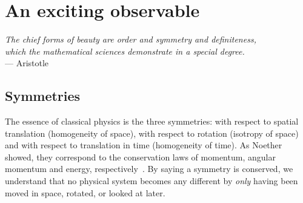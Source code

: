 \chapter{An exciting observable}
\label{ch:nedm-at-psi}




\begin{flushright}{\slshape    
  The chief forms of beauty are order and symmetry and definiteness,\\
  which the mathematical sciences demonstrate in a special degree.} \\ \medskip
--- Aristotle
\end{flushright}

\bigskip



\section{Symmetries}


The essence of classical physics is the three symmetries: with respect to spatial translation (homogeneity of space), with respect to rotation (isotropy of space) and with respect to translation in time (homogeneity of time). As Noether showed, they correspond to the conservation laws of momentum, angular momentum and energy, respectively~\cite{Noether1918}. By saying a symmetry is conserved, we understand that no physical system becomes any different by \emph{only} having been moved in space, rotated, or looked at later.

